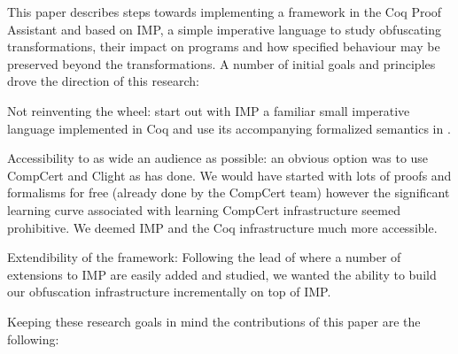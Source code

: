 \documentclass[compsoc,conference,a4paper,10pt,times]{IEEEtran}
\begin{document}
This paper describes steps towards implementing a framework in the Coq Proof Assistant and based on IMP\cite{SFV2}, a simple imperative language to study obfuscating transformations, their impact on programs and how specified behaviour may be preserved beyond the transformations. A number of initial goals and principles drove the direction of this research: 
\begin{enumerate*}
  \item Not reinventing the wheel: start out with IMP a familiar small imperative language implemented in Coq and use its accompanying formalized semantics in \cite{SFV2}.
  \item Accessibility to as wide an audience as possible: an obvious option was to use CompCert and Clight as \cite{Blazy2} has done. We would have started with lots of proofs and formalisms for free (already done by the CompCert team) however the significant learning curve associated with learning CompCert infrastructure seemed prohibitive. We deemed IMP and the Coq infrastructure much more accessible.\label{goal2}
  \item Extendibility of the framework: Following the lead of \cite{SFV2} where a number of extensions to IMP are easily added and studied, we wanted the ability to build our obfuscation infrastructure incrementally on top of IMP.\label{goal3}
  \end{enumerate*} 
  
Keeping these research goals in mind the contributions of this paper are the following:
\end{document}
